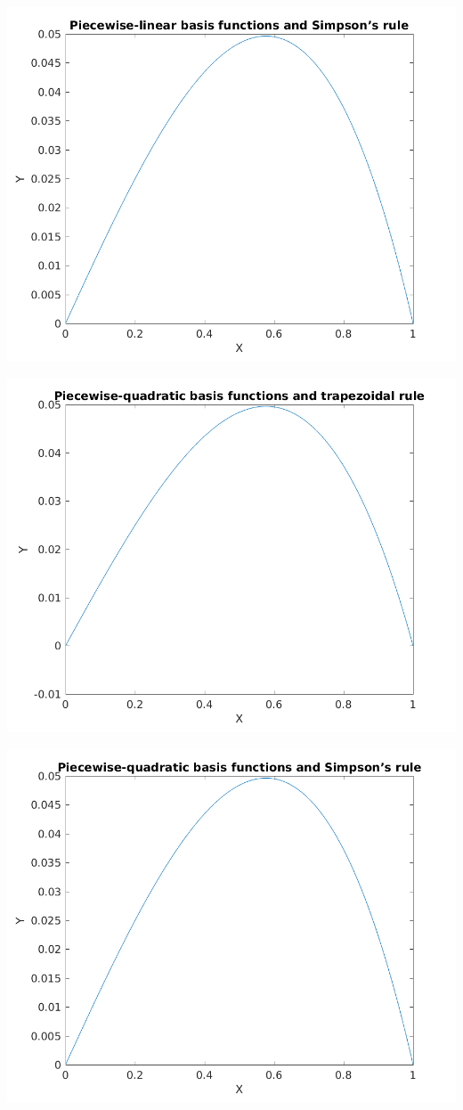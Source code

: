 \documentclass{article}
\begin{document}
\includegraphics{"q2_2"}
\pagebreak


\includegraphics{"q2_3"}
\pagebreak


\includegraphics{"q2_4"}
\pagebreak
\end{document}
